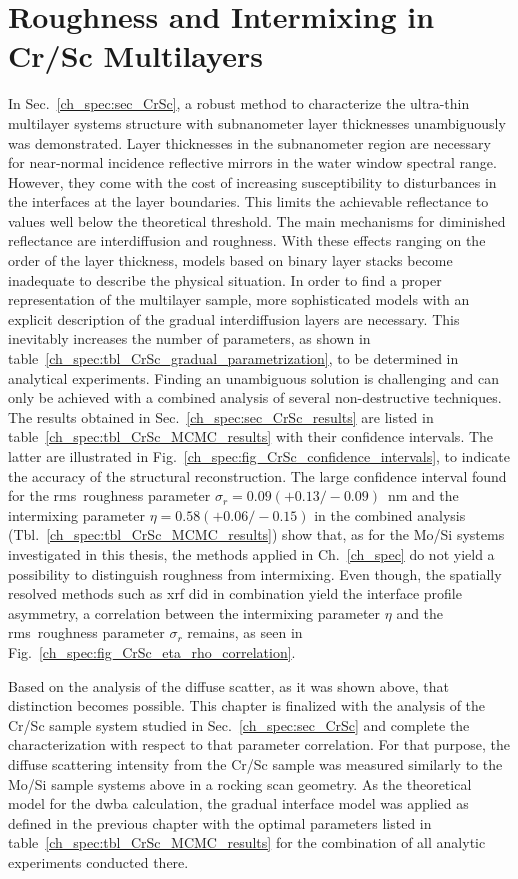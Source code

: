 \section{Roughness and Intermixing in Cr/Sc Multilayers} \label{ch_diff:sec_CrSc}
In Sec.~\ref{ch_spec:sec_CrSc}, a robust method to characterize the ultra-thin multilayer systems structure with subnanometer layer thicknesses unambiguously was demonstrated. Layer thicknesses in the subnanometer region are necessary for near-normal incidence 
reflective mirrors in the water window spectral range. However, they come with 
the cost of increasing susceptibility to disturbances in the interfaces at the 
layer boundaries. This limits the achievable reflectance to values well below 
the theoretical threshold. The main mechanisms for diminished reflectance are 
interdiffusion and roughness. With these effects ranging on the order of the 
layer thickness, models based on binary layer stacks become inadequate to 
describe the physical situation. In order to find a proper representation of 
the multilayer sample, more sophisticated models with an explicit description 
of the gradual interdiffusion layers are necessary. This inevitably 
increases the number of parameters, as shown in table~\ref{ch_spec:tbl_CrSc_gradual_parametrization}, to be determined in analytical experiments. 
Finding an unambiguous solution is challenging and can only be achieved with a 
combined analysis of several non-destructive techniques. The results obtained in Sec.~\ref{ch_spec:sec_CrSc_results} are listed in table~\ref{ch_spec:tbl_CrSc_MCMC_results} with their confidence intervals. The latter are illustrated in Fig.~\ref{ch_spec:fig_CrSc_confidence_intervals}, to indicate the accuracy of the structural reconstruction. The large confidence interval found for the \gls{rms}~roughness parameter $\sigma_r = 0.09(+0.13/-0.09)$~nm and the intermixing parameter $\eta = 0.58(+0.06/-0.15)$ in the combined analysis (Tbl.~\ref{ch_spec:tbl_CrSc_MCMC_results}) show that, as for the Mo/Si systems investigated in this thesis, the methods applied in Ch.~\ref{ch_spec} do not yield a possibility to distinguish roughness from intermixing. Even though, the spatially resolved methods such as \gls{xrf} did in combination yield the interface profile asymmetry, a correlation between the intermixing parameter $\eta$ and the \gls{rms}~roughness parameter $\sigma_r$ remains, as seen in Fig.~\ref{ch_spec:fig_CrSc_eta_rho_correlation}.

Based on the analysis of the diffuse scatter, as it was shown above, that distinction becomes possible. This chapter is finalized with the analysis of the Cr/Sc sample system studied in Sec.~\ref{ch_spec:sec_CrSc} and complete the characterization with respect to that parameter correlation. For that purpose, the diffuse scattering intensity from the Cr/Sc sample was measured similarly to the Mo/Si sample systems above in a rocking scan geometry. As the theoretical model for the \gls{dwba} calculation, the gradual interface model was applied as defined in the previous chapter with the optimal parameters listed in table~\ref{ch_spec:tbl_CrSc_MCMC_results} for the combination of all analytic experiments conducted there.

